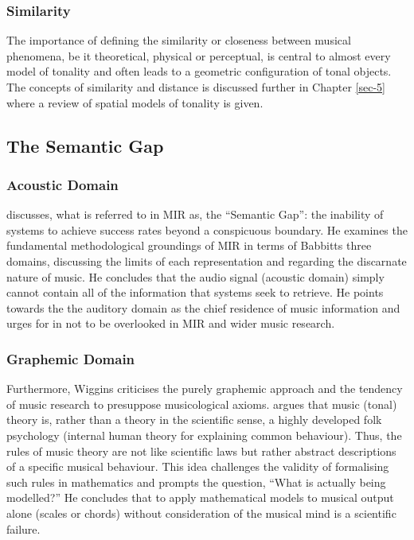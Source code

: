 \documentclass{article}
\begin{document}
\subsubsection{Similarity}
\label{sec-2-2-3}

The importance of defining the similarity or closeness between musical
phenomena, be it theoretical, physical or perceptual, is central to
almost every model of tonality and often leads to a geometric
configuration of tonal objects. The concepts of similarity and
distance is discussed further in Chapter \ref{sec-5}
where a review of spatial models of tonality is given.
\subsection{The Semantic Gap}
\label{sec-2-3}
\subsubsection{Acoustic Domain}
\label{sec-2-3-1}

\citet{Wiggins2009} discusses, what is referred to in MIR as, the
``Semantic Gap'': the inability of systems to achieve success rates
beyond a conspicuous boundary. He examines the fundamental
methodological groundings of MIR in terms of Babbitts three domains,
discussing the limits of each representation and regarding the
discarnate nature of music. He concludes that the audio signal
(acoustic domain) simply cannot contain all of the information that
systems seek to retrieve. He points towards the the auditory domain as
the chief residence of music information and urges for in not to be
overlooked in MIR and wider music research.
\subsubsection{Graphemic Domain}
\label{sec-2-3-2}

Furthermore, Wiggins criticises the purely graphemic approach and the
tendency of music research to presuppose musicological
axioms. \citet{Wiggins2012} argues that music (tonal) theory is,
rather than a theory in the scientific sense, a highly developed folk
psychology (internal human theory for explaining common
behaviour). Thus, the rules of music theory are not like scientific
laws but rather abstract descriptions of a specific musical
behaviour. This idea challenges the validity of formalising such rules
in mathematics and prompts the question, ``What is actually being
modelled?'' He concludes that to apply mathematical models to musical
output alone (scales or chords) without consideration of the musical
mind is a scientific failure.
\end{document}

